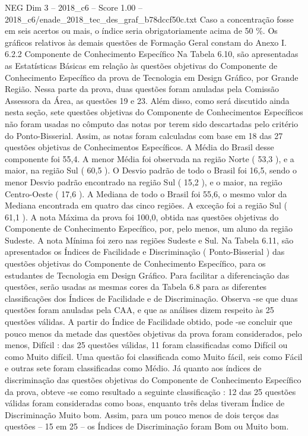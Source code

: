 \begin{textsample}{NEG Dim 3 – 2018\_c6 – Score 1.00 – 2018\_c6/enade\_2018\_tec\_des\_graf\_b78dccf50c.txt}
Caso a concentração fosse em seis acertos ou mais, o índice seria obrigatoriamente acima de 50 \%.
Os gráficos relativos às demais questões de Formação Geral constam do Anexo I. 6.2.2 Componente de Conhecimento Específico Na Tabela 6.10, são apresentadas as Estatísticas Básicas em relação às questões objetivas do Componente de Conhecimento Específico da prova de Tecnologia em Design Gráfico, por Grande Região.
Nessa parte da prova, duas questões foram anuladas pela Comissão Assessora da Área, as questões 19 e 23.
Além disso, como será discutido ainda nesta seção, sete questões objetivas do Componente de Conhecimentos Específicos não foram usadas no cômputo das notas por terem sido descartadas pelo critério do Ponto-Bisserial.
Assim, as notas foram calculadas com base em 18 das 27 questões objetivas de Conhecimentos Específicos.
A Média do Brasil desse componente foi 55,4.
A menor Média foi observada na região Norte ( 53,3 ), e a maior, na região Sul ( 60,5 ).
O Desvio padrão de todo o Brasil foi 16,5, sendo o menor Desvio padrão encontrado na região Sul ( 15,2 ), e o maior, na região Centro-Oeste ( 17,6 ).
A Mediana de todo o Brasil foi 55,6, o mesmo valor da Mediana encontrada em quatro das cinco regiões.
A exceção foi a região Sul ( 61,1 ).
A nota Máxima da prova foi 100,0, obtida nas questões objetivas do Componente de Conhecimento Específico, por, pelo menos, um aluno da região Sudeste.
A nota Mínima foi zero nas regiões Sudeste e Sul.
Na Tabela 6.11, são apresentados os Índices de Facilidade e Discriminação ( Ponto-Bisserial ) das questões objetivas do Componente de Conhecimento Específico, para os estudantes de Tecnologia em Design Gráfico.
Para facilitar a diferenciação das questões, serão usadas as mesmas cores da Tabela 6.8 para as diferentes classificações dos Índices de Facilidade e de Discriminação.
Observa -se que duas questões foram anuladas pela CAA, e que as análises dizem respeito às 25 questões válidas.
A partir do Índice de Facilidade obtido, pode -se concluir que pouco menos da metade das questões objetivas da prova foram considerados, pelo menos, Difícil : das 25 questões válidas, 11 foram classificadas como Difícil ou como Muito difícil.
Uma questão foi classificada como Muito fácil, seis como Fácil e outras sete foram classificadas como Médio.
Já quanto aos índices de discriminação das questões objetivas do Componente de Conhecimento Específico da prova, obteve -se como resultado a seguinte classificação : 12 das 25 questões válidas foram consideradas como boas, enquanto três delas tiveram Índice de Discriminação Muito bom.
Assim, para um pouco menos de dois terços das questões – 15 em 25 – os Índices de Discriminação foram Bom ou Muito bom.

\end{textsample}
